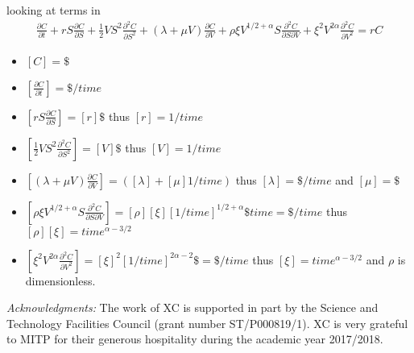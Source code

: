 \documentclass[english,12pt]{article}
\begin{document}
looking at terms in
\begin{eqnarray}
\label{original MG} \frac{\partial C}{\partial t}+ r S \frac{\partial C}{\partial S} + \frac{1}{2} V S^2 \frac{\partial^2 C}{\partial S^2} +(\lambda + \mu V) \frac{\partial C}{\partial V} +\rho \xi V^{1/2+\alpha} S \frac{\partial^2 C}{\partial S \partial V} +\xi^2 V^{2 \alpha}  \frac{\partial^2 C}{\partial V^2}= r C
\end{eqnarray}
\begin{itemize}
\item $[C]=\$$
\item $[\frac{\partial C}{\partial t}]=\$/time$
\item $[r S \frac{\partial C}{\partial S}]= [r] \$ $ thus $[r]=1/time$
\item $[\frac{1}{2} V S^2 \frac{\partial^2 C}{\partial S^2}]=[V] \$$ thus  $[V]=1/time$
\item $[(\lambda + \mu V) \frac{\partial C}{\partial V}]=([\lambda] + [\mu] 1/time)$ thus $[\lambda]=\$/time$ and $[\mu]=\$$
\item $[\rho \xi V^{1/2+\alpha} S \frac{\partial^2 C}{\partial S \partial V}]= [\rho] [\xi] [1/time]^{1/2+\alpha} \$ time=\$ /time$ thus $[\rho] [\xi]= time^{\alpha-3/2}$
\item $[\xi^2 V^{2 \alpha}  \frac{\partial^2 C}{\partial V^2}]=[\xi]^2 [1/time]^{2 \alpha-2} \$=\$/time $ thus $[\xi]=time^{\alpha-3/2}$ and $\rho$ is dimensionless.
\end{itemize}






{\it Acknowledgments:}
The work of XC is supported in part  by the Science and Technology Facilities Council (grant number  ST/P000819/1). XC is very grateful to MITP for their generous hospitality during the academic year 2017/2018. 



\bigskip{}


\baselineskip=1.6pt 

\begin{thebibliography}{10}

   
\end{thebibliography}
\end{document}
